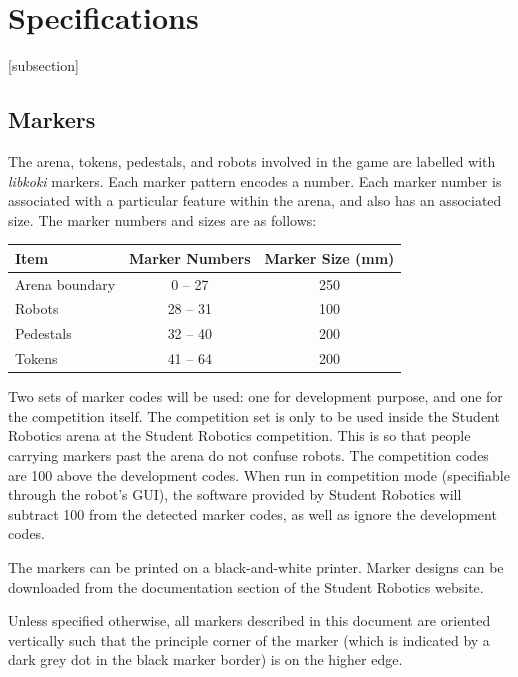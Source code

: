 \section{Specifications}
\label{sec:Specifications}

[subsection]
\newcommand{\rcnii}{\stepcounter{rulei}\arabic{section}.\arabic{subsection}.\arabic{rulei}}
\renewcommand{\labelenumi}{\rcnii}

\subsection{Markers}
\label{sub:markers}
The arena, tokens, pedestals, and robots involved in the game are labelled with \textit{libkoki} markers.
Each marker pattern encodes a number.
Each marker number is associated with a particular feature within the arena, and also has an associated size.
The marker numbers and sizes are as follows:

\begin{center}
  \begin{tabular}{lcc}
    \toprule
    \textbf{Item} & \textbf{Marker Numbers} & \textbf{Marker Size (mm)} \\
    \midrule
    Arena boundary & 0 -- 27 & 250 \\
    Robots & 28 -- 31 & 100 \\
    Pedestals & 32 -- 40 & 200 \\
    Tokens & 41 -- 64 & 200 \\
    \bottomrule
  \end{tabular}
\end{center}

Two sets of marker codes will be used: one for development purpose, and one for the competition itself.
The competition set is only to be used inside the Student Robotics arena at the Student Robotics competition.
This is so that people carrying markers past the arena do not confuse robots.
The competition codes are 100 above the development codes.
When run in competition mode (specifiable through the robot's GUI), the software provided by Student Robotics will subtract 100 from the detected marker codes, as well as ignore the development codes.

The markers can be printed on a black-and-white printer.
Marker designs can be downloaded from the documentation section of the Student Robotics website.

Unless specified otherwise, all markers described in this document are oriented vertically such that the principle corner of the marker (which is indicated by a dark grey dot in the black marker border) is on the higher edge.

